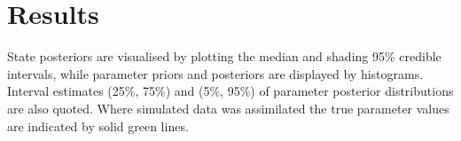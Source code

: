 \documentclass{ruthesis}
\begin{document}
\FloatBarrier
\section{Results}

State posteriors are visualised by plotting the median and shading 95\% credible intervals, while parameter priors and posteriors are displayed by histograms. Interval estimates (25\%, 75\%) and (5\%, 95\%) of parameter posterior distributions are also quoted. 
Where simulated data was assimilated the true parameter values are indicated by solid green lines.


%
%
%
\end{document}
